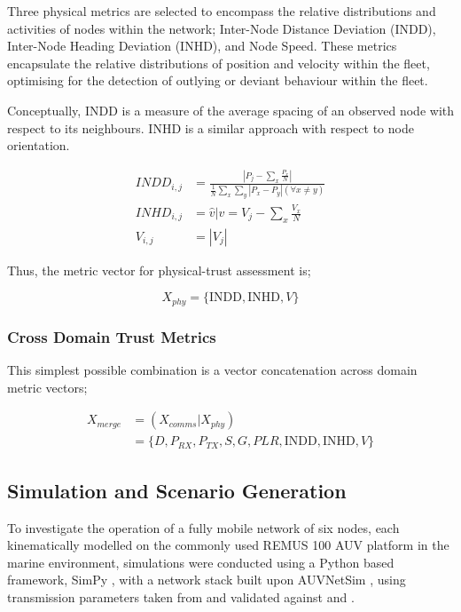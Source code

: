 \documentclass[conference]{IEEEtran}
\begin{document}
Three physical metrics are selected to encompass the relative distributions and activities of nodes within the network; Inter-Node Distance Deviation (INDD), Inter-Node Heading Deviation (INHD), and Node Speed. These metrics encapsulate the relative distributions of position and velocity within the fleet, optimising for the detection of outlying or deviant behaviour within the fleet.

Conceptually, INDD is a measure of the average spacing of an observed node with respect to its neighbours. INHD is a similar approach with respect to node orientation.

\begin{align}
	INDD_{i,j} &= \frac{|P_j - \sum_x \frac{P_x}{N}|}{\frac{1}{N}\sum_x \sum_y{|P_x - P_y| (\forall x \neq y)}}\\
	INHD_{i,j} &= \hat{v} \vert v= V_j - \sum_x{\frac{V_x}{N}}\\
	V_{i,j} &= |V_j|
\end{align}

Thus, the metric vector for physical-trust assessment is;

\begin{equation}
  X_{phy}=\{\text{INDD}, \text{INHD}, V\}
	\label{eq:phys:vector}
\end{equation}

\subsubsection{Cross Domain Trust Metrics}
This simplest possible combination is a vector concatenation across domain metric vectors; 

\begin{align}
  X_{merge} &=  (X_{comms}|X_{phy}) \\
  &= \{D, P_{RX}, P_{TX}, S, G, PLR, \text{INDD}, \text{INHD}, V\}
  \label{eq:phys:vector}
\end{align}


\subsection{Simulation and Scenario Generation}
To investigate the operation of a fully mobile network of six nodes, each kinematically modelled on the commonly used REMUS 100 AUV platform \cite{Milgram2001} in the marine environment, simulations were conducted using a Python based framework, SimPy \cite{Mueller2003SimPy}, with a network stack built upon AUVNetSim \cite{Miquel2008}, using transmission parameters taken from and validated against \cite{Stojanovic2007} and \cite{Stefanov2011}.
\end{document}
